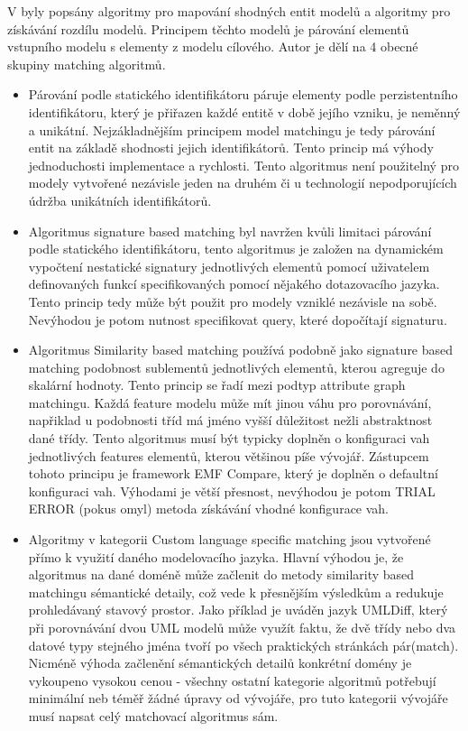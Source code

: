 \documentclass[11pt,twoside,a4paper]{book}
\begin{document}
 V \cite{Kolovos:Different_models} byly popsány algoritmy
 pro mapování shodných entit modelů a algoritmy pro získávání rozdílu modelů. 
 Principem těchto modelů je párování elementů vstupního modelu s elementy z
 modelu cílového. Autor je dělí na 4 obecné skupiny matching algoritmů.
 
 \begin{itemize}
   \item Párování podle statického identifikátoru páruje elementy podle
 	perzistentního identifikátoru, který je přiřazen každé entitě v době jejího
 	vzniku, je neměnný a unikátní. Nejzákladnějším principem model matchingu je
 	tedy párování entit na základě shodnosti jejich identifikátorů. Tento princip
 	má výhody jednoduchosti implementace a rychlosti. Tento algoritmus není
 	použitelný pro modely vytvořené nezávisle jeden na druhém či u technologií
 	nepodporujících údržba unikátních identifikátorů.
 
 	\item Algoritmus signature based matching byl navržen kvůli limitaci párování
 	podle statického identifikátoru, tento algoritmus je založen na dynamickém
 	vypočtení nestatické signatury jednotlivých elementů pomocí uživatelem
 	definovaných funkcí specifikovaných pomocí nějakého dotazovacího jazyka.
 	Tento princip tedy může být použit pro modely vzniklé nezávisle na sobě.
 	Nevýhodou je potom nutnost specifikovat query, které dopočítají signaturu.
 
 	\item Algoritmus Similarity based matching používá podobně jako signature
 	based matching podobnost sublementů jednotlivých elementů, kterou agreguje do
 	skalární hodnoty. Tento princip se řadí mezi podtyp attribute graph
 	\cite{attributed_graph} matchingu.
 	Každá feature modelu může mít jinou váhu pro porovnávání, napřiklad u
 	podobnosti tříd má jméno vyšší důležitost nežli abstraktnost dané třídy. 
 	Tento algoritmus musí být typicky doplněn o konfiguraci vah jednotlivých
 	features elementů, kterou většinou píše vývojář. Zástupcem tohoto principu je
 	framework EMF Compare, který je doplněn o defaultní konfiguraci vah. Výhodami
 	je větší přesnost, nevýhodou je potom TRIAL ERROR (pokus omyl) metoda
 	získávání vhodné konfigurace vah.
 
	\item \label{UML_Diff} Algoritmy v kategorii Custom language specific matching
	jsou vytvořené přímo k využití daného modelovacího jazyka. Hlavní výhodou je, že
 	algoritmus na dané doméně může začlenit do metody similarity based matchingu
 	sémantické detaily, což vede k přesnějším výsledkům a redukuje prohledávaný 
	stavový prostor. Jako příklad je uváděn jazyk UMLDiff, který při porovnávání
	dvou UML modelů může využít faktu, že dvě třídy nebo dva datové typy
	stejného jména tvoří po všech praktických stránkách pár(match). Nicméně výhoda
	začlenění sémantických detailů konkrétní domény je vykoupeno vysokou cenou -
	všechny ostatní kategorie algoritmů potřebují minimální neb téměř žádné úpravy
	od vývojáře, pro tuto kategorii vývojáře musí napsat celý matchovací algoritmus
	sám.
\end{itemize}
\end{document}
